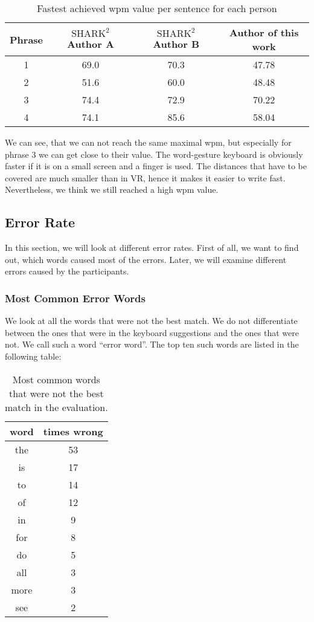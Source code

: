 \begin{table}[H]
    \centering
    \caption{Fastest achieved wpm value per sentence for each person}
    \begin{tabular}{cccc} \toprule
        Phrase&$\text{SHARK}^2$ Author A&$\text{SHARK}^2$ Author B&Author of this work\\ \midrule
        1&69.0&70.3&47.78\\
        2&51.6&60.0&48.48\\
        3&74.4&72.9&70.22\\
        4&74.1&85.6&58.04\\
        \bottomrule
    \end{tabular}
    \label{tab:top speed}
\end{table}
We can see, that we can not reach the same maximal wpm, but especially for phrase 3 we can get close to their value. The word-gesture keyboard is obviously faster if it is on a small screen and a finger is used. The distances that have to be covered are much smaller than in VR, hence it makes it easier to write fast. Nevertheless, we think we still reached a high wpm value.

\subsection{Error Rate}
In this section, we will look at different error rates. First of all, we want to find out, which words caused most of the errors. Later, we will examine different errors caused by the participants.

\subsubsection{Most Common Error Words}
We look at all the words that were not the best match. We do not differentiate between the ones that were in the keyboard suggestions and the ones that were not. We call such a word ``error word''. The top ten such words are listed in the following table:
\begin{table}[H]
    \centering
    \caption{Most common words that were not the best match in the evaluation.}
    \begin{tabular}{cc} \toprule
        word&times wrong\\ \midrule
        the & 53\\
        is & 17\\
        to & 14\\
        of & 12\\
        in & 9\\
        for & 8\\
        do & 5\\
        all & 3\\
        more & 3\\
        see & 2\\
        \bottomrule
    \end{tabular}
    \label{tab:error_words}
\end{table}

